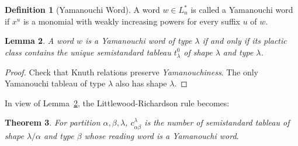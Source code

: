 \documentclass[11pt]{amsart}
\newtheorem{theorem}{Theorem}[subsection]
\newtheorem{lemma}[theorem]{Lemma}
\theoremstyle{definition}
\newtheorem{definition}[theorem]{Definition}
\theoremstyle{example}
\begin{document}
\begin{definition}
  [Yamanouchi Word]
  A word $w\in L_n^*$ is called a Yamanouchi word if $x^u$ is a monomial with weakly increasing powers for every suffix $u$ of $w$.
\end{definition}
\begin{lemma}
  \label{lemma:yamanouchi}
  A word $w$ is a Yamanouchi word of type $\lambda$ if and only if its plactic class contains the unique semistandard tableau $t^0_\lambda$ of shape $\lambda$ and type $\lambda$.
\end{lemma}
\begin{proof}
  Check that Knuth relations preserve \emph{Yamanouchiness}.
  The only Yamanouchi tableau of type $\lambda$ also has shape $\lambda$.
\end{proof}
In view of Lemma~\ref{lemma:yamanouchi}, the Littlewood-Richardson rule becomes:
\begin{theorem}
  For partition $\alpha,\beta,\lambda$, $c^\lambda_{\alpha\beta}$ is the number of semistandard tableau of shape $\lambda/\alpha$ and type $\beta$ whose reading word is a Yamanouchi word.
\end{theorem}


\end{document}

